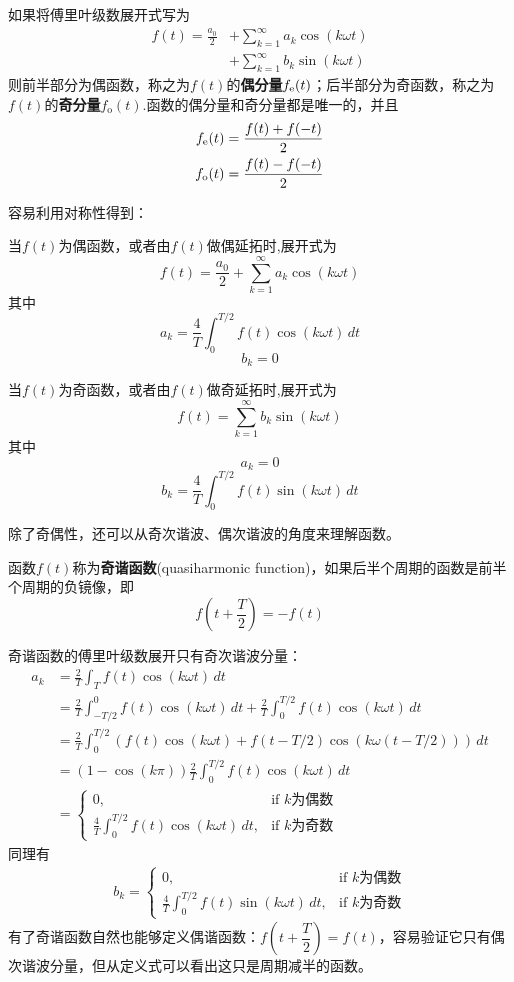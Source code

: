 如果将傅里叶级数展开式写为
\begin{align*}
    f(t) =  \frac{a_0}{2}&+\sum_{k = 1}^{\infty} a_k \cos(k\omega t) \\
           & +\sum_{k = 1}^{\infty} b_k \sin(k\omega t)
\end{align*}
则前半部分为偶函数，称之为$f(t)$的\textbf{偶分量}$f_{\mathrm{e}}(t)$；后半部分为奇函数，称之为$f(t)$的\textbf{奇分量}$f_\text{o}(t)$.函数的偶分量和奇分量都是唯一的，并且\begin{align*}
    f_{\mathrm{e}}(t)=\frac{f(t)+f(-t)}{2} \\
    f_\text{o}(t)=\frac{f(t)-f(-t)}{2}
\end{align*}

容易利用对称性得到：
\begin{theorem}[偶函数的傅里叶展开]
当$f(t)$为偶函数，或者由$f(t)$做偶延拓时,展开式为
\[f(t)=\frac{a_0}{2}+\sum_{k = 1}^{\infty} a_k\cos(k\omega t)\]
其中
\[a_k=\frac{4}{T}\int_{0}^{T/2} f(t)\cos(k\omega t)\,dt\]
\[b_k=0\]
\end{theorem}

\begin{theorem}[奇函数的傅里叶展开]
当$f(t)$为奇函数，或者由$f(t)$做奇延拓时,展开式为
\[f(t)=\sum_{k = 1}^{\infty} b_k \sin(k\omega t)\]
其中
\[a_k=0\]
\[b_k=\frac{4}{T}\int_{0}^{T/2} f(t)\sin(k\omega t)\,dt\]
\end{theorem}

除了奇偶性，还可以从奇次谐波、偶次谐波的角度来理解函数。
\begin{definition}[奇谐函数]
    函数$f(t)$称为\textbf{奇谐函数}(quasiharmonic function)，如果后半个周期的函数是前半个周期的负镜像，即\begin{equation*}
    f\left(t+\frac{T}{2}\right)=-f(t)
\end{equation*}
\end{definition}
奇谐函数的傅里叶级数展开只有奇次谐波分量：
\begin{align*}
    a_k &=\frac{2}{T}\int_{T}f(t)\cos(k\omega t)\,dt\\
    &=\frac{2}{T}\int_{-T/2}^{0}f(t)\cos(k\omega t)\,dt+\frac{2}{T}\int_{0}^{T/2}f(t)\cos(k\omega t)\,dt\\
    &=\frac{2}{T}\int_{0}^{T/2}\left(f(t)\cos(k\omega t)+f(t-T/2)\cos(k\omega(t-T/2))\right)\,dt\\
    &=(1-\cos(k\pi))\frac{2}{T}\int_{0}^{T/2}f(t)\cos(k\omega t)\,dt\\
    &=\begin{cases}
        0,&\text{if }k\text{为偶数}\\
        \frac{4}{T}\int_{0}^{T/2}f(t)\cos(k\omega t)\,dt,&\text{if }k\text{为奇数}
    \end{cases}
\end{align*}
同理有\begin{align*}
    b_k=\begin{cases}
        0,&\text{if }k\text{为偶数}\\
        \frac{4}{T}\int_{0}^{T/2}f(t)\sin(k\omega t)\,dt,&\text{if }k\text{为奇数}
    \end{cases}
\end{align*}
有了奇谐函数自然也能够定义偶谐函数：$f\left(t+\dfrac{T}{2}\right)=f(t)$，容易验证它只有偶次谐波分量，但从定义式可以看出这只是周期减半的函数。

